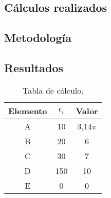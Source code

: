 \begin{anexo}
	
\chapter{Cálculos realizados}

	\section{Metodología}
		\lipsum[1-2]


	\section{Resultados}
		\lipsum[10]

		\begin{table}[H]
			\centering
			\caption{Tabla de cálculo.}
			\begin{tabular}{ccc}
				\hline
				\textbf{Elemento} & $\epsilon_i$ & \boldmath{}\textbf{Valor}\unboldmath{} \bigstrut\\
				\hline
				A     & 10    & 3,14$\pi$ \bigstrut[t]\\
				B     & 20    & 6 \\
				C     & 30    & 7 \\
				D     & 150    & 10 \\
				E     & 0    & 0 \\
				\hline
				\end{tabular}
			\label{tab:anexo-1}
		\end{table}

\end{anexo}
